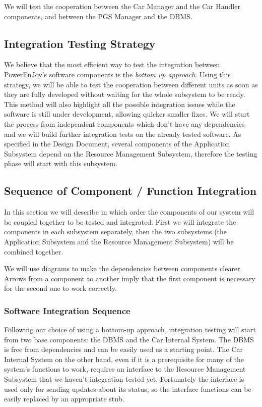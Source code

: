 \documentclass[english]{article}
\begin{document}
We will test the cooperation between the Car Manager and the Car Handler components, and between the PGS Manager and the DBMS.



\subsection{Integration Testing Strategy}
We believe that the most efficient way to test the integration between PowerEnJoy's software components is the \emph{bottom up approach}. Using this strategy, we will be able to test the cooperation between different units as soon as they are fully developed without waiting for the whole subsystem to be ready. This method will also highlight all the possible integration issues while the software is still under development, allowing quicker smaller fixes.
We will start the process from independent components which don't have any dependencies and we will build further integration tests on the already tested software.
As specified in the Design Document, several components of the Application Subsystem depend on the Resource Management Subsystem, therefore the testing phase will start with this subsystem.


\subsection{Sequence of Component / Function Integration}
\label{subsec:sequence}
In this section we will describe in which order the components of our system will be coupled together to be tested and integrated.
First we will integrate the components in each subsystem separately, then the two subsystems (the Application Subsystem and the Resource Management Subsystem) will be combined together.

We will use diagrams to make the dependencies between components clearer. Arrows from a component to another imply that the first component is necessary for the second one to work correctly.


\subsubsection{Software Integration Sequence}

Following our choice of using a bottom-up approach, integration testing will start from two base components: the DBMS and the Car Internal System.
The DBMS is free from dependencies and can be easily used as a starting point.
The Car Internal System on the other hand, even if it is a prerequisite for many of the system's functions to work, requires an interface to the Resource Management Subsystem that we haven't integration tested yet. Fortunately the interface is used only for sending updates about its status, so the interface functions can be easily replaced by an appropriate stub.
\end{document}
